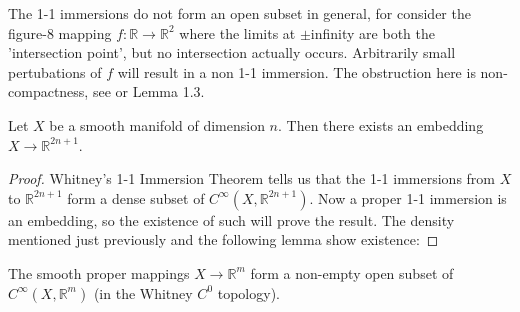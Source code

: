 \documentclass[12pt]{article}
\newcommand{\RR}{\mathbb{R}}
\begin{document}
\begin{remark}
    The 1-1 immersions do not form an open subset in general, for consider the figure-8 mapping $f: \RR \to \RR^2$ where the limits at $\pm$infinity are both the 'intersection point', but no intersection actually occurs. Arbitrarily small pertubations of $f$ will result in a non 1-1 immersion. The obstruction here is non-compactness, see \cite{singularities} or \cite{hirsch} Lemma 1.3. 
\end{remark}



\begin{theorem} 
    Let $X$ be a smooth manifold of dimension $n$. Then there exists an embedding $X \to \RR^{2n+1}$. 
\end{theorem}

\begin{proof}
    Whitney's 1-1 Immersion Theorem tells us that the 1-1 immersions from $X$ to $\RR^{2n+1}$ form a dense subset of $C^\infty(X, \RR^{2n+1})$. Now a proper 1-1 immersion is an embedding, so the existence of such will prove the result. The density mentioned just previously and the following lemma show existence:
\end{proof}

\begin{lemma}
    The smooth proper mappings $X \to \RR^m$ form a non-empty open subset of $C^\infty(X, \RR^m)$ (in the Whitney $C^0$ topology). 
\end{lemma}
\end{document}
